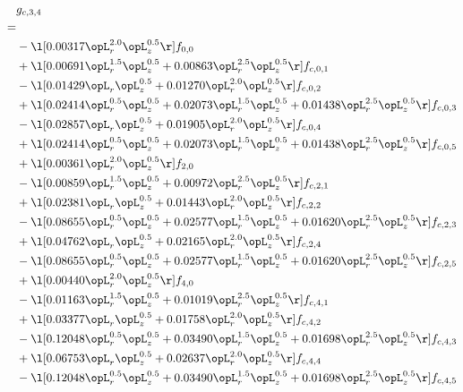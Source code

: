 \begin{alignat}{2} 
\label{eq:g_34_0} 
& g_{c,3,4} \nonumber \\ 
 = \\ 
& - \l[  0.00317 \opL_r^{2.0} \opL_z^{0.5}  \r] f_{0,0} \nonumber \\ 
& + \l[  0.00691 \opL_r^{1.5} \opL_z^{0.5} +  0.00863 \opL_r^{2.5} \opL_z^{0.5}  \r] f_{c,0,1} \nonumber \\ 
& - \l[  0.01429 \opL_r \opL_z^{0.5} +  0.01270 \opL_r^{2.0} \opL_z^{0.5}  \r] f_{c,0,2} \nonumber \\ 
& + \l[  0.02414 \opL_r^{0.5} \opL_z^{0.5} +  0.02073 \opL_r^{1.5} \opL_z^{0.5} +  0.01438 \opL_r^{2.5} \opL_z^{0.5}  \r] f_{c,0,3} \nonumber \\ 
& - \l[  0.02857 \opL_r \opL_z^{0.5} +  0.01905 \opL_r^{2.0} \opL_z^{0.5}  \r] f_{c,0,4} \nonumber \\ 
& + \l[  0.02414 \opL_r^{0.5} \opL_z^{0.5} +  0.02073 \opL_r^{1.5} \opL_z^{0.5} +  0.01438 \opL_r^{2.5} \opL_z^{0.5}  \r] f_{c,0,5} \nonumber \\ 
& + \l[  0.00361 \opL_r^{2.0} \opL_z^{0.5}  \r] f_{2,0} \nonumber \\ 
& - \l[  0.00859 \opL_r^{1.5} \opL_z^{0.5} +  0.00972 \opL_r^{2.5} \opL_z^{0.5}  \r] f_{c,2,1} \nonumber \\ 
& + \l[  0.02381 \opL_r \opL_z^{0.5} +  0.01443 \opL_r^{2.0} \opL_z^{0.5}  \r] f_{c,2,2} \nonumber \\ 
& - \l[  0.08655 \opL_r^{0.5} \opL_z^{0.5} +  0.02577 \opL_r^{1.5} \opL_z^{0.5} +  0.01620 \opL_r^{2.5} \opL_z^{0.5}  \r] f_{c,2,3} \nonumber \\ 
& + \l[  0.04762 \opL_r \opL_z^{0.5} +  0.02165 \opL_r^{2.0} \opL_z^{0.5}  \r] f_{c,2,4} \nonumber \\ 
& - \l[  0.08655 \opL_r^{0.5} \opL_z^{0.5} +  0.02577 \opL_r^{1.5} \opL_z^{0.5} +  0.01620 \opL_r^{2.5} \opL_z^{0.5}  \r] f_{c,2,5} \nonumber \\ 
& + \l[  0.00440 \opL_r^{2.0} \opL_z^{0.5}  \r] f_{4,0} \nonumber \\ 
& - \l[  0.01163 \opL_r^{1.5} \opL_z^{0.5} +  0.01019 \opL_r^{2.5} \opL_z^{0.5}  \r] f_{c,4,1} \nonumber \\ 
& + \l[  0.03377 \opL_r \opL_z^{0.5} +  0.01758 \opL_r^{2.0} \opL_z^{0.5}  \r] f_{c,4,2} \nonumber \\ 
& - \l[  0.12048 \opL_r^{0.5} \opL_z^{0.5} +  0.03490 \opL_r^{1.5} \opL_z^{0.5} +  0.01698 \opL_r^{2.5} \opL_z^{0.5}  \r] f_{c,4,3} \nonumber \\ 
& + \l[  0.06753 \opL_r \opL_z^{0.5} +  0.02637 \opL_r^{2.0} \opL_z^{0.5}  \r] f_{c,4,4} \nonumber \\ 
& - \l[  0.12048 \opL_r^{0.5} \opL_z^{0.5} +  0.03490 \opL_r^{1.5} \opL_z^{0.5} +  0.01698 \opL_r^{2.5} \opL_z^{0.5}  \r] f_{c,4,5} \nonumber \\ 
\end{alignat} 


